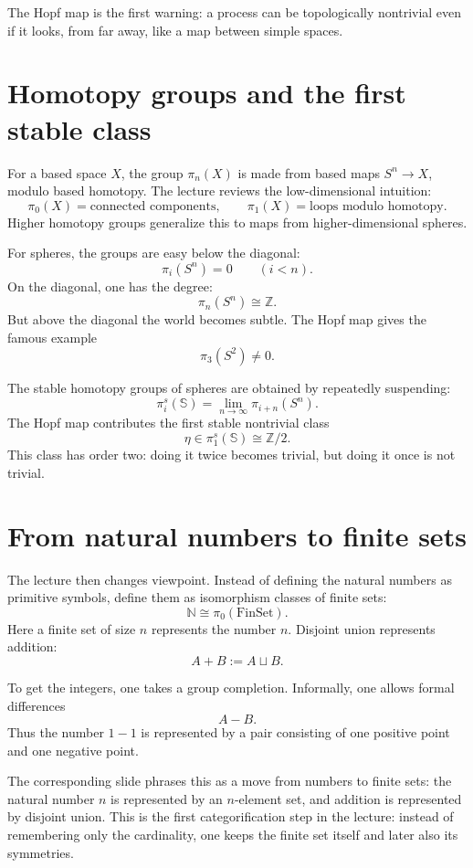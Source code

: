 The Hopf map is the first warning: a process can be topologically nontrivial even if it looks, from far away, like a map between simple spaces.

\section{Homotopy groups and the first stable class}

For a based space \(X\), the group \(\pi_n(X)\) is made from based maps \(S^n\to X\), modulo based homotopy.  The lecture reviews the low-dimensional intuition:
\[
  \pi_0(X)=\text{connected components},
  \qquad
  \pi_1(X)=\text{loops modulo homotopy}.
\]
Higher homotopy groups generalize this to maps from higher-dimensional spheres.

For spheres, the groups are easy below the diagonal:
\[
  \pi_i(S^n)=0
  \qquad (i<n).
\]
On the diagonal, one has the degree:
\[
  \pi_n(S^n)\cong\mathbb Z.
\]
But above the diagonal the world becomes subtle.  The Hopf map gives the famous example
\[
  \pi_3(S^2)\neq0.
\]

The stable homotopy groups of spheres are obtained by repeatedly suspending:
\[
  \pi_i^s(\mathbb S)
  =
  \lim_{n\to\infty}\pi_{i+n}(S^n).
\]
The Hopf map contributes the first stable nontrivial class
\[
  \eta\in \pi_1^s(\mathbb S)\cong\mathbb Z/2.
\]
This class has order two: doing it twice becomes trivial, but doing it once is not trivial.

\section{From natural numbers to finite sets}

The lecture then changes viewpoint.  Instead of defining the natural numbers as primitive symbols, define them as isomorphism classes of finite sets:
\[
  \mathbb N
  \cong
  \pi_0(\mathrm{FinSet}).
\]
Here a finite set of size \(n\) represents the number \(n\).  Disjoint union represents addition:
\[
  A+B := A\sqcup B.
\]

To get the integers, one takes a group completion.  Informally, one allows formal differences
\[
  A-B.
\]
Thus the number \(1-1\) is represented by a pair consisting of one positive point and one negative point.

\begin{remark}
The corresponding slide phrases this as a move from numbers to finite sets: the natural number \(n\) is represented by an \(n\)-element set, and addition is represented by disjoint union.  This is the first categorification step in the lecture: instead of remembering only the cardinality, one keeps the finite set itself and later also its symmetries.
\end{remark}


